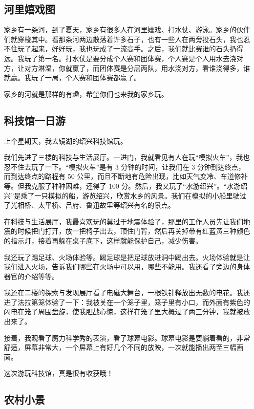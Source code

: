 \documentclass[UTF8,a4paper,titlepage,twoside,10.5pt]{article}
\begin{document}
\subsection{河里嬉戏图}
\label{sec:org6271b35}

家乡有一条河，到了夏天，家乡有很多人在河里嬉戏、打水仗、游泳。家乡的伙伴们就穿梭其中。看那条河两边散落着许多石子，也有一些人在两旁投石头，我也忍不住玩了起来，好好玩，我也玩成了一流高手。之后，我们就比赛谁的石头扔得远。我玩了第一名。打水仗是要分成个人赛和团体赛，个人赛是个人用水去浇对方，让对方淋湿，你就赢了，而团体赛是分层两队，用水浇对方，看谁浇得多，谁就赢。我玩了一局，个人赛和团体赛都赢了。

家乡的河就是那样的有趣，希望你们也来我的家乡玩。

\subsection{科技馆一日游}
\label{sec:orgc8c8b46}

上个星期天，我去镜湖的绍兴科技馆玩。

我们先进了三楼的科技与生活展厅。一进门，我就看见有人在玩“模拟火车”，我也忍不住去玩了一下。“模拟火车”是有 3 分钟的时间，让我们在 3 分钟到达终点，而到达终点的路程有 50 公里，而且不断地有危险出现，比如天气变冷、车道修补等。但我克服了种种困难，还得了 100 分。然后，我又玩了“水游绍兴”。“水游绍兴”是乘了一只模拟的船，游览绍兴，欣赏水乡的风景。我们在模拟的小船里驶过了光相桥、太平桥、吕府、鲁迅故里等绍兴有名的景点。

在科技与生活展厅，我最喜欢玩的莫过于地震体验了，那里的工作人员先让我们地震的时候把门打开，放一把椅子出去，顶住门背，然后再关掉带有红蓝黄三种颜色的指示灯，接着再躲在桌子底下，这样就能保护自己，减少伤害。

我还玩了踢足球、火场体验等。踢足球是把足球放进洞中踢出去。火场体验就是让我们进入火场，告诉我们哪些在火场中可以用，哪些不能用。我还看了旁边的身体器官的介绍等等。

我还在二楼的探索与发现展厅看了电磁大舞台，一根铁针释放出无数的电花。我还进了法拉第笼体验了一下：我被关在一个笼子里，笼子里有小口，而外面有紫色的闪电在笼子周围盘旋，使我胆战心惊，这样在笼子里大概过了两三分钟，我就被放出来了。

接着，我观看了魔力科学秀的表演，看了球幕电影。球幕电影是要躺着看的，非常舒适，屏幕非常大，一个屏幕上有好几个不同的放映，一次就能播出两至三幅画面。

这次游玩科技馆，真是很有收获哦！

\subsection{农村小景}
\label{sec:org64c99f4}
\end{document}
